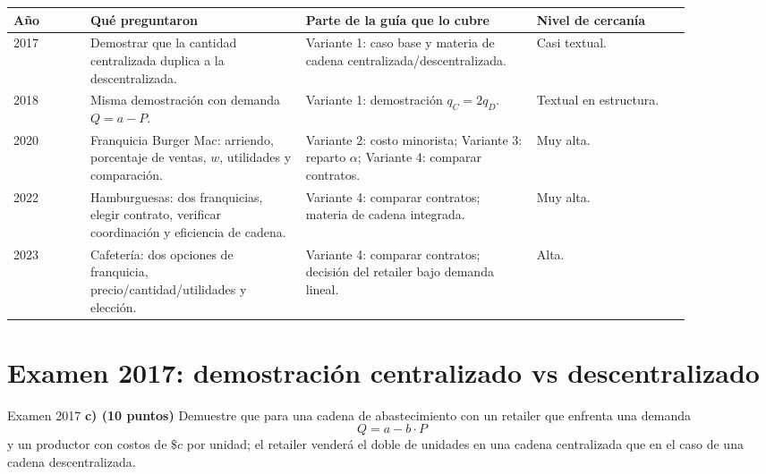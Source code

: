 \documentclass[11pt,a4paper]{article}
\begin{document}
\small
\setlength{\tabcolsep}{3pt}
\begin{longtable}{p{0.10\linewidth}p{0.28\linewidth}p{0.30\linewidth}p{0.20\linewidth}}
\toprule
\textbf{Año} & \textbf{Qué preguntaron} & \textbf{Parte de la guía que lo cubre} & \textbf{Nivel de cercanía} \\
\midrule
\endhead
2017 & Demostrar que la cantidad centralizada duplica a la descentralizada. & Variante 1: caso base y materia de cadena centralizada/descentralizada. & Casi textual. \\
2018 & Misma demostración con demanda \(Q=a-P\). & Variante 1: demostración \(q_C=2q_D\). & Textual en estructura. \\
2020 & Franquicia Burger Mac: arriendo, porcentaje de ventas, \(w\), utilidades y comparación. & Variante 2: costo minorista; Variante 3: reparto \(\alpha\); Variante 4: comparar contratos. & Muy alta. \\
2022 & Hamburguesas: dos franquicias, elegir contrato, verificar coordinación y eficiencia de cadena. & Variante 4: comparar contratos; materia de cadena integrada. & Muy alta. \\
2023 & Cafetería: dos opciones de franquicia, precio/cantidad/utilidades y elección. & Variante 4: comparar contratos; decisión del retailer bajo demanda lineal. & Alta. \\
\bottomrule
\end{longtable}
\normalsize
\setlength{\tabcolsep}{6pt}

\section{Examen 2017: demostración centralizado vs descentralizado}

\begin{enunciado}{Examen 2017}
\textbf{c) (10 puntos)} Demuestre que para una cadena de abastecimiento con un retailer que enfrenta una demanda
\[
Q = a - b\cdot P
\]
y un productor con costos de \(\$c\) por unidad; el retailer venderá el doble de unidades en una cadena centralizada que en el caso de una cadena descentralizada.
\end{enunciado}
\end{document}
